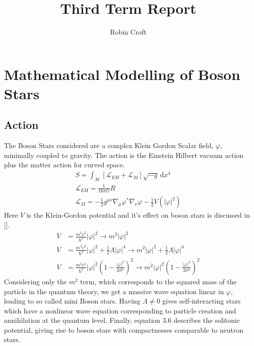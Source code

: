 \documentclass[11pt, oneside]{report}  %
\title{Third Term Report}
\author{Robin Croft}
\renewcommand{\L}{\mathcal{L}}
\newcommand{\vp}{\varphi}
\newcommand{\dd}{\mathrm{d}}
\numberwithin{equation}{section}
\begin{document}
\tableofcontents
\newpage








\section{Mathematical Modelling of Boson Stars}
\subsection{Action}
The Boson Stars considered are a complex Klein Gordon Scalar field, $\varphi$, minimally coupled to gravity. The action is the Einstein Hilbert vacuum action plus the matter action for curved space.
\begin{gather} S = \int_\mathcal{M}\left[\mathcal{L}_{EH} + \mathcal{L}_M\right] \sqrt{-g}\,\dd x^4 \\
 \L_{EH} = \frac{1}{16\pi G}R \\
 \L_{M} =-\frac{1}{2}g^{\mu\nu}\nabla_\mu \varphi^* \nabla_\nu \varphi - \frac{1}{2}V(|\varphi|^2)  \end{gather}
Here $V$ is the Klein-Gordon potential and it's effect on boson stars is discussed in [].
\begin{align}
V &= \frac{m^2 c^2}{\hbar^2 }|\vp|^2 \rightarrow m^2 |\vp|^2\\
V &= \frac{m^2 c^2}{\hbar^2 }|\vp|^2 + \frac{1}{2}\Lambda|\vp|^4 \rightarrow m^2|\vp|^2 + \frac{1}{2}\Lambda|\vp|^4\\
V &= \frac{m^2 c^2}{\hbar^2 }|\vp|^2\left(1-\frac{|\vp|^2}{2\sigma^2}\right)^2 \rightarrow {m^2 }|\vp|^2\left(1-\frac{|\vp|^2}{2\sigma^2}\right)^2
\end{align}
Considering only the $m^2$ term, which corresponds to the squared mass of the particle in the quantum theory, we get a massive wave equation linear in $\varphi$, leading to so called mini Boson stars. Having $\Lambda\neq0$ gives self-interacting stars which have a nonlinear wave equation corresponding to particle creation and annihilation at the quantum level. Finally, equation 3.6 describes the solitonic potential, giving rise to boson stars with compactnesses comparable to neutron stars. 
\end{document}
